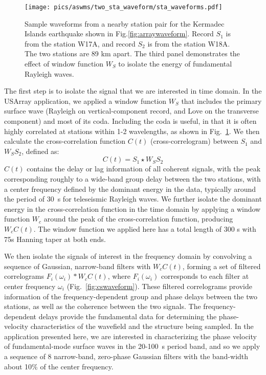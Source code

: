 \begin{figure}
	\center
	\texttt{[image: pics/aswms/two\_sta\_waveform/sta\_waveforms.pdf]}
	\caption[Sample waveforms from a nearby station pair for the Kermadec Islands earthquake.]{Sample waveforms from a nearby station pair for the Kermadec Islands earthquake shown in Fig.\ref{fig:arraywaveform}. Record $S_1$ is from the station W17A, and record $S_2$ is from the station W18A. The two stations are 89 km apart. The third panel demonstrates the effect of window function $W_S$ to isolate the energy of fundamental Rayleigh waves.}
	\label{fig:twostawaveform}
\end{figure}

The first step is to isolate the signal that we are interested in time domain. In the USArray application, we applied a window function $W_S$ that includes the primary surface wave (Rayleigh on vertical-component record, and Love on the transverse component) and most of its coda. Including the coda is useful, in that it is often highly correlated at stations within 1-2 wavelengths, as shown in Fig.~\ref{fig:twostawaveform}. We then calculate the cross-correlation function $C(t)$ (cross-correlogram) between $S_1$ and $W_SS_2$, defined as:
\begin{equation}
	C(t) = S_1 \star W_S S_2
\end{equation}
$C(t)$ contains the delay or lag information of all coherent signals, with the peak corresponding roughly to a wide-band group delay between the two stations, with a center frequency defined by the dominant energy in the data, typically around the period of 30~s for teleseismic Rayleigh waves. 
We further isolate the dominant energy in the cross-correlation function in the time domain by applying a window function $W_c$ around the peak of the cross-correlation function, producing $W_cC(t)$. The window function we applied here has a total length of 300 s with 75s Hanning taper at both ends.

We then isolate the signals of interest in the frequency domain by convolving a sequence of Gaussian, narrow-band filters with $W_cC(t)$, forming a set of filtered correlograms $F_i(\omega_i) \ast W_c C(t)$, where $F_i(\omega_i)$ corresponds to each filter at center frequency $\omega_i$ (Fig.~\ref{fig:cswaveform}). These filtered correlograms provide information of the frequency-dependent group and phase delays between the two stations, as well as the coherence between the two signals. The frequency-dependent delays provide the fundamental data for determining the phase-velocity characteristics of the wavefield and the structure being sampled.  In the application presented here, we are interested in characterizing the phase velocity of fundamental-mode surface waves in the 20-100~s period band, and so we apply a sequence of 8 narrow-band, zero-phase Gaussian filters with the band-width about 10\% of the center frequency.


